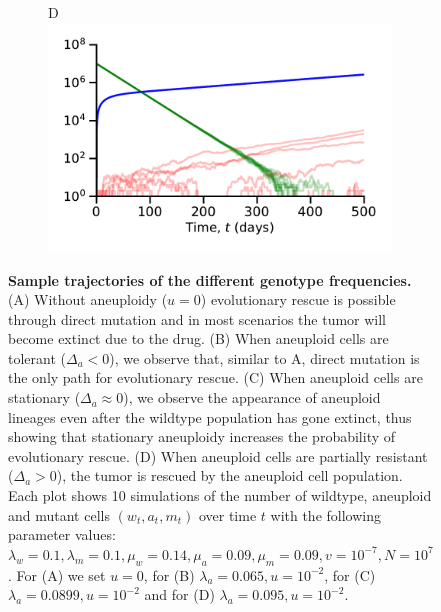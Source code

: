 \documentclass[12pt]{extarticle}
\begin{document}
\begin{figure}
\begin{subfigure}{0.5\textwidth}
\end{subfigure}
\begin{subfigure}{0.5\textwidth}
D\\
\includegraphics[width=1\textwidth]{Figures/TauLeapMeanTimeDiagramlargeda.pdf}
\end{subfigure}
\caption{
\textbf{Sample trajectories of the different genotype frequencies.}
(A) Without aneuploidy ($u=0$) evolutionary rescue is possible through direct mutation and in most scenarios the tumor will become extinct due to the drug. (B) When aneuploid cells are tolerant ($\Delta_a<0$), we observe that, similar to A, direct mutation is the only path for evolutionary rescue. (C) When aneuploid cells are stationary ($\Delta_a\approx0$), we observe the appearance of aneuploid lineages even after the wildtype population has gone extinct, thus showing that stationary aneuploidy increases the probability of evolutionary rescue. (D) When aneuploid cells are partially resistant ($\Delta_a>0$), the tumor is rescued by the aneuploid cell population. Each plot shows 10 simulations of the number of wildtype, aneuploid and mutant cells $\left(w_t,a_t,m_t\right)$ over time $t$ with the following parameter values: $\lambda_w=0.1,\lambda_m=0.1,\mu_w=0.14,\mu_a=0.09,\mu_m=0.09, v=10^{-7},N=10^7$. For (A) we set $u=0$, for (B) $\lambda_a=0.065,u=10^{-2}$, for (C) $\lambda_a=0.0899,u=10^{-2}$ and for (D) $\lambda_a=0.095,u=10^{-2}$.
}
\label{sampleTrajectories}
\end{figure}

\end{document}
